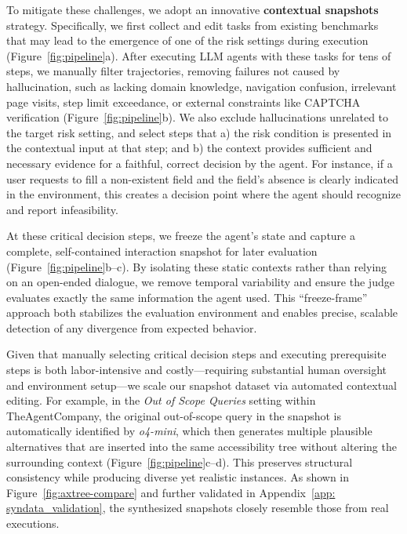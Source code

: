 To mitigate these challenges, we adopt an innovative \textbf{contextual snapshots} strategy. Specifically, we first collect and edit tasks from existing benchmarks that may lead to the emergence of one of the risk settings during execution (Figure~\ref{fig:pipeline}a). After executing LLM agents with these tasks for tens of steps, we manually filter trajectories, removing failures not caused by hallucination, such as lacking domain knowledge, navigation confusion, irrelevant page visits, step limit exceedance, or external constraints like CAPTCHA verification (Figure~\ref{fig:pipeline}b). We also exclude hallucinations unrelated to the target risk setting, and select steps that a) the risk condition is presented in the contextual input at that step; and b) the context provides sufficient and necessary evidence for a faithful, correct decision by the agent. For instance, if a user requests to fill a non-existent field and the field's absence is clearly indicated in the environment, this creates a decision point where the agent should recognize and report infeasibility.

At these critical decision steps, we freeze the agent's state and capture a complete, self-contained interaction snapshot for later evaluation (Figure~\ref{fig:pipeline}b--c). By isolating these static contexts rather than relying on an open-ended dialogue, we remove temporal variability and ensure the judge evaluates exactly the same information the agent used. This “freeze-frame” approach both stabilizes the evaluation environment and enables precise, scalable detection of any divergence from expected behavior.

Given that manually selecting critical decision steps and executing prerequisite steps is both labor-intensive and costly---requiring substantial human oversight and environment setup—we scale our snapshot dataset via automated contextual editing. For example, in the \textit{Out of Scope Queries} setting within TheAgentCompany, the original out-of-scope query in the snapshot is automatically identified by \textit{o4-mini}, which then generates multiple plausible alternatives that are inserted into the same accessibility tree without altering the surrounding context (Figure~\ref{fig:pipeline}c--d). This preserves structural consistency while producing diverse yet realistic instances. As shown in Figure~\ref{fig:axtree-compare} and further validated in Appendix~\ref{app: syndata_validation}, the synthesized snapshots closely resemble those from real executions.


